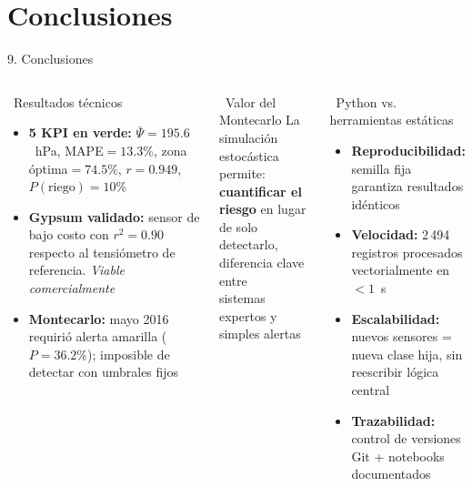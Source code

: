 \documentclass[11pt, aspectratio=169]{beamer}
\newcommand{\tick}{\textcolor{SmartGreen}{\ding{52}}}
\begin{document}
\section{Conclusiones}

\begin{frame}{9. Conclusiones}

\begin{columns}[t]

\begin{exampleblock}{\tick\ Resultados técnicos}
\begin{itemize}\footnotesize
    \item \textbf{5 KPI en verde:} $\bar{\Psi}=195.6$~hPa, MAPE$=13.3\%$, zona óptima$=74.5\%$, $r=0.949$, $P(\text{riego})=10\%$
    \item \textbf{Gypsum validado:} sensor de bajo costo con $r^2=0.90$ respecto al tensiómetro de referencia. \textit{Viable comercialmente}
    \item \textbf{Montecarlo:} mayo 2016 requirió alerta amarilla ($P=36.2\%$); imposible de detectar con umbrales fijos
\end{itemize}
\end{exampleblock}

\begin{block}{\tick\ Valor del Montecarlo}
\footnotesize
La simulación estocástica permite:\\
\textbf{cuantificar el riesgo} en lugar de solo\\
detectarlo, diferencia clave entre\\
sistemas expertos y simples alertas
\end{block}


\begin{block}{\tick\ Python vs. herramientas estáticas}
\begin{itemize}\footnotesize
    \item \textbf{Reproducibilidad:} semilla fija garantiza resultados idénticos
    \item \textbf{Velocidad:} 2\,494 registros procesados vectorialmente en $<1$~s
    \item \textbf{Escalabilidad:} nuevos sensores = nueva clase hija, sin reescribir lógica central
    \item \textbf{Trazabilidad:} control de versiones Git + notebooks documentados
\end{itemize}
\end{block}


\end{columns}
\end{frame}
\end{document}
